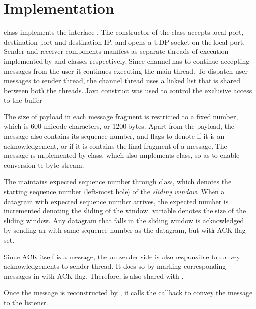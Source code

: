 \section{Implementation}
\label{sec:impl}

 class implements the interface .
The constructor of the class accepts local port, destination port and
destination IP, and opens a UDP socket on the local port. Sender and
receiver components manifest as separate threads of execution
implemented by  and  classes
respectively. Since channel has to continue accepting messages from
the user it continues executing the main thread. To dispatch
user messages to sender thread, the channel thread uses a
 linked list that is shared between both the threads.
Java construct  was used to control the exclusive
access to the buffer. 

The size of payload in each message fragment is restricted to a fixed
number, which is 600 unicode characters, or 1200 bytes. Apart from the
payload, the message also contains its sequence number, and flags to
denote if it is an acknowledgement, or if it is contains the final
fragment of a message. The message is implemented by 
class, which also implements  class, so as to
enable conversion to byte stream. 

The  maintains expected sequence number through
 class, which denotes the starting sequence number
(left-most hole) of the \emph{sliding window}. When a datagram with
expected sequence number arrives, the expected number is incremented
denoting the sliding of the window. 
variable denotes the size of the sliding window. Any datagram that
falls in the sliding window is acknowledged by sending an
 with same sequence number as the datagram, but with
ACK flag set.

Since ACK itself is a message, the  on sender
side is also responsible to convey acknowledgements to sender thread.
It does so by marking corresponding messages in  with
ACK flag. Therefore,  is also shared with
.

Once the message is reconstructed by , it calls
the callback to convey the message to the listener.
